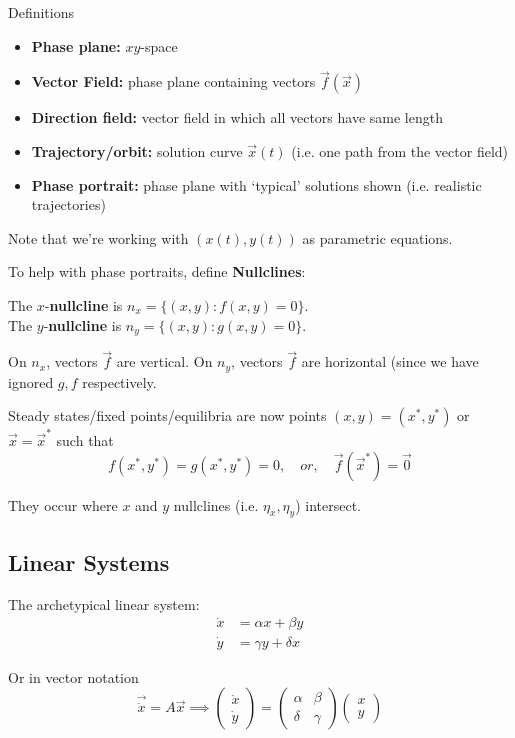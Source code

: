 \documentclass{/home/janmebows/Documents/LatexTemplates/myassignment}
\begin{document}
Definitions
\begin{itemize}
    \item \textbf{Phase plane:} $xy$-space
    \item \textbf{Vector Field:} phase plane containing vectors $\vec f(\vec x)$
    \item \textbf{Direction field:} vector field in which all vectors have same length
    \item \textbf{Trajectory/orbit:} solution curve $\vec x(t)$ (i.e. one path from the vector field)
    \item \textbf{Phase portrait:} phase plane with `typical' solutions shown (i.e. realistic trajectories)
\end{itemize}
Note that we're working with $(x(t),y(t))$ as parametric equations.

To help with phase portraits, define \textbf{Nullclines}:

The $x$-\textbf{nullcline} is $n_x=\{(x,y) : f(x,y) = 0\}$.\\
The $y$-\textbf{nullcline} is $n_y=\{(x,y) : g(x,y) = 0\}$.

On $n_x$, vectors $\vec f$ are vertical. On $n_y$, vectors $\vec f$ are horizontal (since we have ignored $g,f$ respectively.

Steady states/fixed points/equilibria are now points $(x,y) = (x^*,y^*)$ or $\vec x = \vec x^*$ such that
\[f(x^*,y^*) = g(x^*,y^*) = 0, \quad or, \quad  \vec f (\vec x^*) = \vec 0\]

They occur where $x$ and $y$ nullclines (i.e. $\eta_x,\eta_y$) intersect.

\subsection{Linear Systems}
The archetypical linear system:
\begin{align*}
    \dot x &= \alpha x + \beta y\\
    \dot y &= \gamma y + \delta x
\end{align*}

Or in vector notation
\[\vec{\dot x} = A\vec x \implies 
\begin{pmatrix}\dot x\\\dot y\end{pmatrix} =
\begin{pmatrix}\alpha & \beta \\\delta &\gamma \end{pmatrix}
\begin{pmatrix}x\\y\end{pmatrix}
\]
\end{document}
